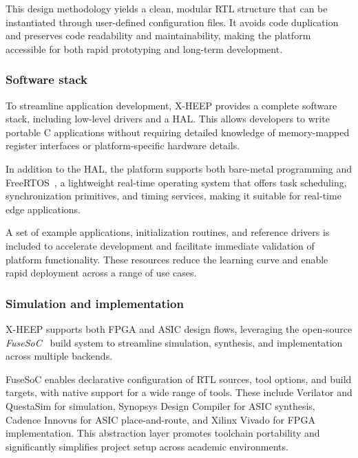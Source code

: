                This design methodology yields a clean, modular RTL structure that can be instantiated through user-defined configuration files. It avoids code duplication and preserves code readability and maintainability, making the platform accessible for both rapid prototyping and long-term development.
 
            \subsubsection*{Software stack}
            
                To streamline application development, \mbox{X-HEEP} provides a complete software stack, including low-level drivers and a HAL. This allows developers to write portable C applications without requiring detailed knowledge of memory-mapped register interfaces or platform-specific hardware details.
                
                In addition to the HAL, the platform supports both bare-metal programming and FreeRTOS~\cite{freertos}, a lightweight real-time operating system that offers task scheduling, synchronization primitives, and timing services, making it suitable for real-time edge applications.
                
                A set of example applications, initialization routines, and reference drivers is included to accelerate development and facilitate immediate validation of platform functionality. These resources reduce the learning curve and enable rapid deployment across a range of use cases.
            
            \subsubsection*{Simulation and implementation}
            
                \mbox{X-HEEP} supports both FPGA and ASIC design flows, leveraging the open-source \emph{FuseSoC}~\cite{fusesoc} build system to streamline simulation, synthesis, and implementation across multiple backends.
                
                FuseSoC enables declarative configuration of RTL sources, tool options, and build targets, with native support for a wide range of tools. These include Verilator and QuestaSim for simulation, Synopsys Design Compiler for ASIC synthesis, Cadence Innovus for ASIC place-and-route, and Xilinx Vivado for FPGA implementation. This abstraction layer promotes toolchain portability and significantly simplifies project setup across academic environments.
                
